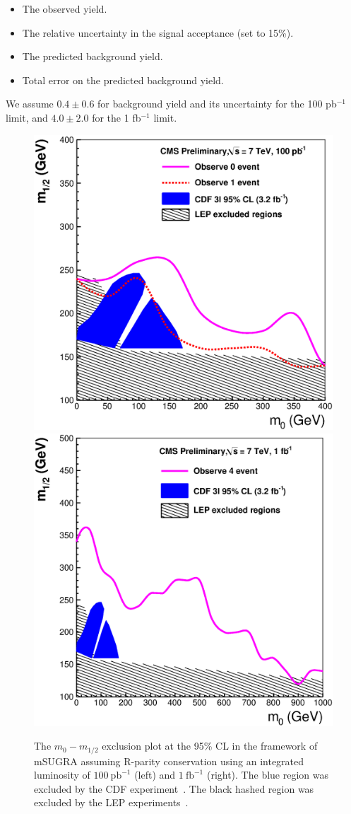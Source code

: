 \begin{itemize}
\item The observed yield.
\item The relative  uncertainty in  the  signal acceptance (set  to 15\%).
\item The predicted  background yield.
\item Total  error  on the  predicted background yield.
\end{itemize}
We assume $0.4 \pm 0.6$ for background yield and its uncertainty for the 100 pb$^{-1}$ limit, and
$4.0\pm 2.0$ for the 1 fb$^{-1}$ limit.
\vspace{3 mm}
\begin{figure}[htb]
\begin{center}

\includegraphics[width=0.485\linewidth]{figs/exclusion100ss.eps}
\includegraphics[width=0.485\linewidth]{figs/exclusion1fbss.eps}
\caption{The $m_{0}-m_{1/2}$ exclusion plot at the 95\% CL in the framework of 
mSUGRA assuming R-parity conservation using an  integrated  luminosity of  
$100~\mathrm{pb}^{-1}$ (left) and $1~\mathrm{fb}^{-1}$ (right). The blue region
was excluded by the CDF experiment~\cite{cdf:recentSusy}. The black hashed region was excluded
by the LEP experiments~\cite{lep:lepsusyreach}.\label{fig:ss_exclusion}}

\end{center}
\end{figure}

